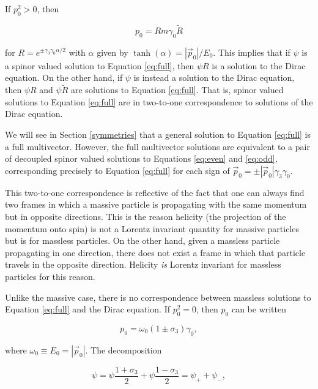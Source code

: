 \documentclass{article}
\begin{document}
  If $p_0^2 > 0$, then 

  \begin{equation}
    p_0 = R m \gamma_0 \widetilde R\label{eq:R}
  \end{equation} 

  for $R = e^{\pm \gamma_3 \gamma_0 \alpha/2}$ with $\alpha$ given by $\tanh(\alpha) = |\vec p_0|/E_0$. This implies that if $\psi$ is a spinor valued solution to Equation \ref{eq:full}, then $\psi R$ is a solution to the Dirac equation. On the other hand, if $\psi$ is instead a solution to the Dirac equation, then $\psi R$ and $\psi \widetilde R$ are solutions to Equation \ref{eq:full}. That is, spinor valued solutions to Equation \ref{eq:full} are in two-to-one correspondence to solutions of the Dirac equation. 

  We will see in Section \ref{symmetries} that a general solution to Equation \ref{eq:full} is a full multivector. However, the full multivector solutions are equivalent to a pair of decoupled spinor valued solutions to Equations \ref{eq:even} and \ref{eq:odd}, corresponding precisely to Equation \ref{eq:full} for each sign of $\vec p_0 = \pm |\vec p_0| \gamma_3 \gamma_0$.

  This two-to-one correspondence is reflective of the fact that one can always find two frames in which a massive particle is propagating with the same momentum but in opposite directions. This is the reason helicity (the projection of the momentum onto spin) is not a Lorentz invariant quantity for massive particles but is for massless particles. On the other hand, given a massless particle propagating in one direction, there does not exist a frame in which that particle travels in the opposite direction. Helicity \emph{is} Lorentz invariant for massless particles for this reason.

  Unlike the massive case, there is no correspondence between massless solutions to Equation \ref{eq:full} and the Dirac equation.  If $p_0^2 = 0$, then $p_0$ can be written

  \begin{equation}
    p_0 = \omega_0 (1 \pm \sigma_3) \gamma_0, \label{eq:massless}
  \end{equation}

  where $\omega_0 \equiv E_0 = |\vec p_0|$. The decomposition

  \begin{equation}
    \psi = \psi \frac{1 + \sigma_3}{2} + \psi \frac{1 - \sigma_3}{2} = \psi_+ + \psi_-,
  \end{equation}
\end{document}
